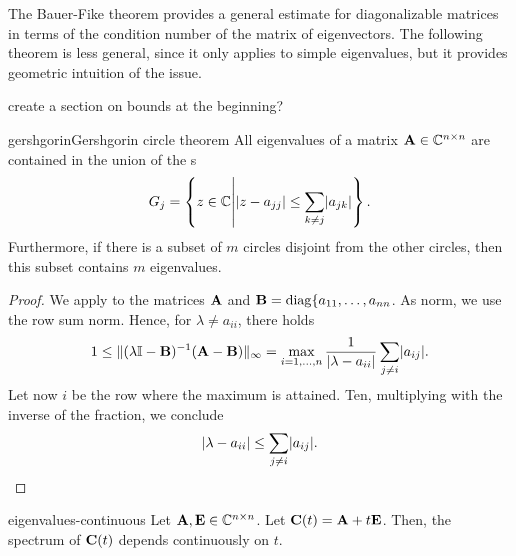 The Bauer-Fike theorem provides a general estimate for diagonalizable
matrices in terms of the condition number of the matrix of
eigenvectors. The following theorem is less general, since it only
applies to simple eigenvalues, but it provides geometric intuition of
the issue.

\begin{todo}
  create a section on bounds at the beginning?
\end{todo}

\begin{Theorem*}{gershgorin}{Gershgorin circle theorem}
  All eigenvalues of a matrix $\mathbf A\in\mathbb C^{n\times n}$ are contained in the
  union of the s
  \begin{gather}
    G_j = \left\{ z\in \mathbb C \middle| \lvert z-a_{jj}\rvert \le \sum_{k\neq j} \lvert a_{jk}\rvert\right\}.
  \end{gather}
  Furthermore, if there is a subset of $m$ circles disjoint from the
  other circles, then this subset contains $m$ eigenvalues.
\end{Theorem*}

\begin{proof}
  We apply  to the matrices $\mathbf A$
  and $\mathbf B=\operatorname{diag}\{a_{11},\dots,a_{nn}$. As norm, we use the row sum
  norm. Hence, for $\lambda\neq a_{ii}$, there holds
  \begin{gather}
    1 \le \lVert(\lambda\mathbb I-\mathbf B)^{-1}(\mathbf A-\mathbf B)\rVert_{\infty}
    = \max_{i=1,\dots,n}\frac1{\lvert\lambda-a_{ii}\rvert} \sum_{j\neq i}\lvert a_{ij}\rvert.
  \end{gather}
  Let now $i$ be the row where the maximum is attained. Ten,
  multiplying with the inverse of the fraction, we conclude
  \begin{gather}
    \lvert\lambda-a_{ii}\rvert \le  \sum_{j\neq i}\lvert a_{ij}\rvert.
  \end{gather}
\end{proof}

\begin{Theorem}{eigenvalues-continuous}
  Let $\mathbf A,\mathbf E\in\mathbb C^{n\times n}$. Let $\mathbf C(t) = \mathbf A + t \mathbf E$. Then,
  the spectrum of $\mathbf C(t)$ depends continuously on $t$.
\end{Theorem}

